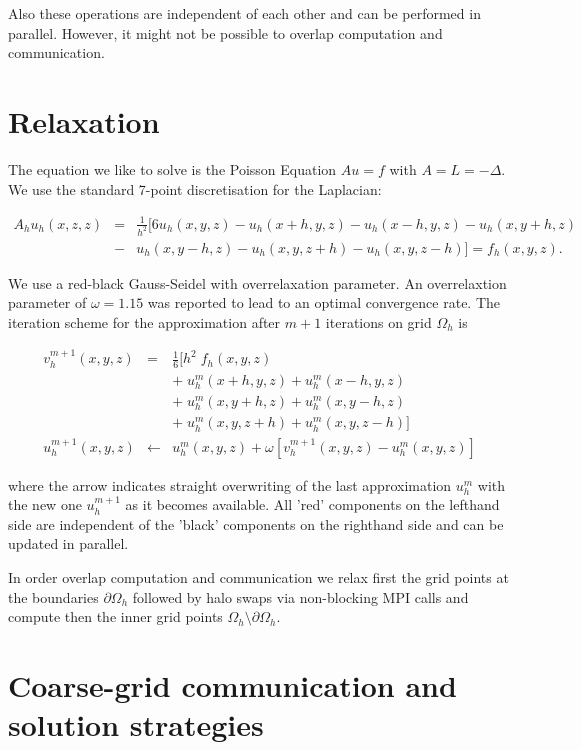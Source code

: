 \documentclass[11pt, oneside, a4paper]{article}
\begin{document}
Also these operations are independent of each other and can be performed in parallel. However, it might not be possible to overlap computation and communication.

\section{Relaxation}

The equation we like to solve is the Poisson Equation $A u = f$ with $A=L=-\Delta$. 
We use the standard 7-point discretisation for the Laplacian:

\begin{eqnarray*}
A_h u_h(x,z,z) &=& \frac{1}{h^2} [6 u_h(x,y,z) - u_h(x+h,y,z) - u_h(x-h,y,z)-u_h(x, y+h,z) \\
 &-& u_h(x,y-h,z) - u_h(x,y,z+h) - u_h(x,y,z-h)] = f_h(x,y,z).
\end{eqnarray*}
 
We use a red-black Gauss-Seidel with overrelaxation parameter. An overrelaxtion parameter of $\omega=1.15$ was reported to lead to an optimal convergence rate. The iteration scheme for the approximation after $m+1$ iterations on grid $\Omega_h$ is

\begin{eqnarray*}
v^{m+1}_h(x,y,z) &=& \frac{1}{6} [h^2\;f_h(x,y,z)\\
&&+\;u_h^m(x+h,y,z)+u_h^m(x-h,y,z)\\
&&+\; u_h^m(x,y+h,z)+u_h^m(x,y-h,z)\\
&&+\; u_h^m(x,y,z+h)+u_h^m(x,y,z-h)]\\
u^{m+1}_h(x,y,z) &\leftarrow& u^m_h(x,y,z)+\omega[v^{m+1}_h(x,y,z)-u^m_h(x,y,z)]
\end{eqnarray*}

where the arrow indicates straight overwriting of the last approximation $u^m_h$ with the new one $u^{m+1}_h$ as it becomes available. All 'red' components on the lefthand side are independent of the 'black' components on the righthand side and can be updated in parallel.

In order overlap computation and communication we relax first the grid points at the boundaries $\partial\Omega_h$ followed by halo swaps via non-blocking MPI calls and compute then the inner grid points $\Omega_h\setminus\partial\Omega_h$.

\section{Coarse-grid communication and solution strategies}
\end{document}
